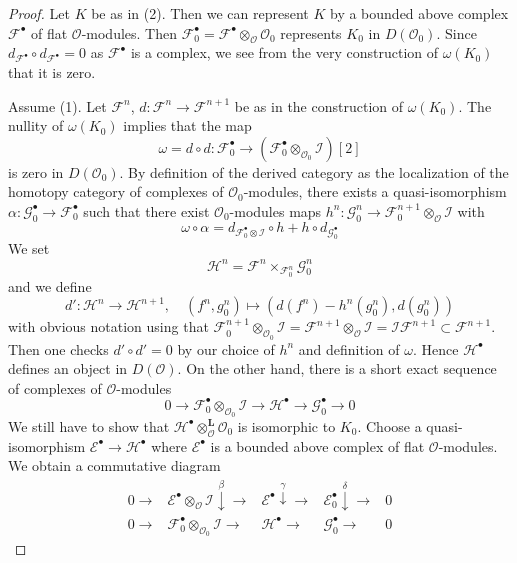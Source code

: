 \begin{proof}

Let $K$ be as in (2). Then we can represent $K$ by a bounded above
complex $\mathcal{F}^\bullet$ of flat $\mathcal{O}$-modules.
Then $\mathcal{F}_0^\bullet =
\mathcal{F}^\bullet \otimes_{\mathcal{O}} \mathcal{O}_0$
represents $K_0$ in $D(\mathcal{O}_0)$.
Since $d_{\mathcal{F}^\bullet} \circ d_{\mathcal{F}^\bullet} = 0$
as $\mathcal{F}^\bullet$ is a complex, we see from the very construction
of $\omega(K_0)$ that it is zero.

\medskip\noindent
Assume (1). Let $\mathcal{F}^n$, $d : \mathcal{F}^n \to \mathcal{F}^{n + 1}$
be as in the construction of $\omega(K_0)$. The nullity of
$\omega(K_0)$ implies that the map
$$
\omega = d \circ d : \mathcal{F}_0^\bullet
\longrightarrow
(\mathcal{F}_0^\bullet \otimes_{\mathcal{O}_0} \mathcal{I})[2]
$$
is zero in $D(\mathcal{O}_0)$. By definition of the derived category
as the localization of the homotopy category of complexes
of $\mathcal{O}_0$-modules, there exists a quasi-isomorphism
$\alpha : \mathcal{G}_0^\bullet \to \mathcal{F}_0^\bullet$
such that there exist $\mathcal{O}_0$-modules maps
$h^n : \mathcal{G}_0^n \to
\mathcal{F}_0^{n + 1} \otimes_\mathcal{O} \mathcal{I}$
with
$$
\omega \circ \alpha =
d_{\mathcal{F}_0^\bullet \otimes \mathcal{I}} \circ h +
h \circ d_{\mathcal{G}_0^\bullet}
$$
We set
$$
\mathcal{H}^n = \mathcal{F}^n \times_{\mathcal{F}^n_0} \mathcal{G}_0^n
$$
and we define
$$
d' : \mathcal{H}^n \longrightarrow \mathcal{H}^{n + 1},\quad
(f^n, g_0^n) \longmapsto (d(f^n) - h^n(g_0^n), d(g_0^n))
$$
with obvious notation using that
$\mathcal{F}_0^{n + 1} \otimes_{\mathcal{O}_0} \mathcal{I} =
\mathcal{F}^{n + 1} \otimes_\mathcal{O} \mathcal{I} =
\mathcal{I}\mathcal{F}^{n + 1} \subset \mathcal{F}^{n + 1}$.
Then one checks $d' \circ d' = 0$ by our choice of $h^n$
and definition of $\omega$.
Hence $\mathcal{H}^\bullet$ defines an object in $D(\mathcal{O})$.
On the other hand, there is a short exact sequence of complexes
of $\mathcal{O}$-modules
$$
0 \to \mathcal{F}_0^\bullet \otimes_{\mathcal{O}_0} \mathcal{I} \to
\mathcal{H}^\bullet \to \mathcal{G}_0^\bullet \to 0
$$
We still have to show that
$\mathcal{H}^\bullet \otimes_\mathcal{O}^\mathbf{L} \mathcal{O}_0$
is isomorphic to $K_0$.
Choose a quasi-isomorphism
$\mathcal{E}^\bullet \to \mathcal{H}^\bullet$
where $\mathcal{E}^\bullet$ is a bounded above complex of flat
$\mathcal{O}$-modules. We obtain a commutative diagram
$$
\begin{array}{ccccc}0 \longrightarrow & \mathcal{E}^\bullet \otimes_\mathcal{O} \mathcal{I} \overset{\beta}{\downarrow}\longrightarrow & \mathcal{E}^\bullet \overset{\gamma}{\downarrow}\longrightarrow & \mathcal{E}_0^\bullet \overset{\delta}{\downarrow}\longrightarrow & 0 \\ 0 \longrightarrow & \mathcal{F}_0^\bullet \otimes_{\mathcal{O}_0} \mathcal{I} \longrightarrow & \mathcal{H}^\bullet \longrightarrow & \mathcal{G}_0^\bullet \longrightarrow & 0\end{array}
$$
\end{proof}
